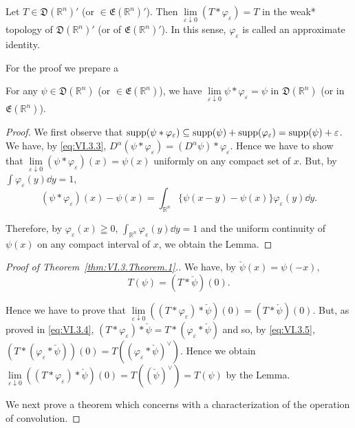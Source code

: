 \begin{theorem}\label{thm:VI.3.Theorem.1} Let $T \in \mathfrak{D}(\mathbb{R}^{n})'$ (or $\in \mathfrak{E}(\mathbb{R}^{n})'$). Then $\lim\limits_{\varepsilon \downarrow 0} (T * \varphi_\varepsilon) = T$ in the weak* topology of $\mathfrak{D}(\mathbb{R}^{n})'$ (or of $\mathfrak{E}(\mathbb{R}^{n})'$). In this sense, $\varphi_\varepsilon$ is called an approximate identity. 
\end{theorem}

For the proof we prepare a 

\begin{lemmau} For any $\psi \in \mathfrak{D}(\mathbb{R}^{n})$ (or $\in \mathfrak{E}(\mathbb{R}^{n})$), we have $\lim\limits_{\varepsilon \downarrow 0} \psi * \varphi_{\varepsilon} = \psi$ in $\mathfrak{D}(\mathbb{R}^{n})$ (or in $\mathfrak{E}(\mathbb{R}^{n})$). 
\end{lemmau}

\begin{proof}
 We first observe that $\operatorname{supp}(\psi * \varphi_{\varepsilon}) \subseteq \operatorname{supp}(\psi) + \operatorname{supp}(\varphi_{\varepsilon}) = \operatorname{supp}(\psi) + \varepsilon$. We have, by \eqref{eq:VI.3.3}, $D^{\alpha}(\psi * \varphi_{\varepsilon}) = (D^{\alpha}\psi) * \varphi_{\varepsilon}$. Hence we have to show that $\lim\limits_{\varepsilon \downarrow 0} (\psi * \varphi_{\varepsilon})(x) = \psi(x)$ uniformly on any compact set of $x$. But, by $\int \varphi_{\varepsilon}(y) \dd y = 1$, 
\[
(\psi * \varphi_{\varepsilon}) (x) - \psi (x) = \int_ {\mathbb{R}^{n}} \{\psi (x - y) - \psi (x) \} \varphi_{\varepsilon} (y) \dd y. \]

Therefore, by $\varphi_{\varepsilon}(x) \geqq 0$, $\int_{\mathbb{R}^{n}} \varphi_{\varepsilon}(y) \dd y = 1$ and the uniform continuity of $\psi(x)$ on any compact interval of $x$, we obtain the Lemma. 
\end{proof}

\begin{proof}[Proof of Theorem~\ref{thm:VI.3.Theorem.1}.]
We have, by $\check{\psi}(x) = \psi(-x)$,
\begin{equation}\label{eq:VI.3.5}
T (\psi) = (T * \check {\psi}) (0).
\end{equation}

Hence we have to prove that $\lim\limits_{\varepsilon \downarrow 0} ((T * \varphi_{\varepsilon}) * \check{\psi}) (0) = (T * \check{\psi}) (0)$. But, as proved in \eqref{eq:VI.3.4}, $(T * \varphi_{\varepsilon}) * \check{\psi} = T * (\varphi_{\varepsilon} * \check{\psi})$ and so, by \eqref{eq:VI.3.5}, $(T * (\varphi_{\varepsilon} * \check{\psi})) (0) = T((\varphi_{\varepsilon} * \check{\psi})^{\vee})$. Hence we obtain $\lim\limits_{\varepsilon \downarrow 0} ((T * \varphi_{\varepsilon}) * \check{\psi}) (0) = T((\check{\psi})^{\vee}) = T(\psi)$ by the Lemma. 

We next prove a theorem which concerns with a characterization of the operation of convolution. 
\end{proof}

